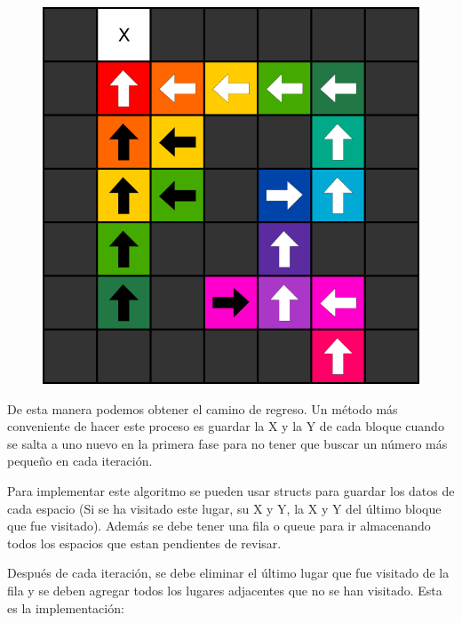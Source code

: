 \documentclass{article}
\begin{document}
\begin{figure}[H]
    \centering
    \includegraphics[width=0.3\paperwidth]{bfscamino}
\end{figure}

De esta manera podemos obtener el camino de regreso. Un método más conveniente de hacer este proceso es guardar la X y la Y de cada bloque cuando se salta a uno nuevo en la primera fase para no tener que buscar un número más pequeño en cada iteración.

Para implementar este algoritmo se pueden usar structs para guardar los datos de cada espacio (Si se ha visitado este lugar, su X y Y, la X y Y del último bloque que fue visitado). Además se debe tener una fila o queue para ir almacenando todos los espacios que estan pendientes de revisar.

Después de cada iteración, se debe eliminar el último lugar que fue visitado de la fila y se deben agregar todos los lugares adjacentes que no se han visitado. Esta es la implementación:
\end{document}
